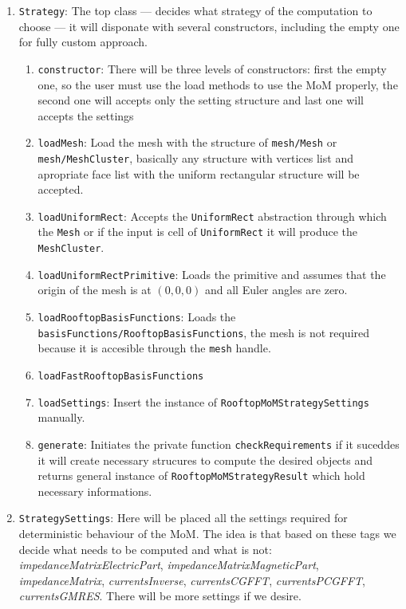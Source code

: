 \documentclass[9pt]{article}
\begin{document}
    \begin{enumerate}[label=\Roman*.]
        \item \texttt{Strategy}: The top class --- decides what strategy of the computation to choose --- it will disponate with several constructors, including the empty one for fully custom approach.
        \begin{enumerate}[label=\roman*.]
            \item \texttt{constructor}: There will be three levels of constructors: first the empty one, so the user must use the load methods to use the MoM properly, the second one will accepts only the setting structure and last one will accepts the settings 
            \item \texttt{loadMesh}: Load the mesh with the structure of \texttt{mesh/Mesh} or \texttt{mesh/MeshCluster}, basically any structure with vertices list and apropriate face list with the uniform rectangular structure will be accepted.
            \item \texttt{loadUniformRect}: Accepts the \texttt{UniformRect} abstraction through which the \texttt{Mesh} or if the input is cell of \texttt{UniformRect} it will produce the \texttt{MeshCluster}.
            \item \texttt{loadUniformRectPrimitive}: Loads the primitive and assumes that the origin of the mesh is at $(0, 0, 0)$ and all Euler angles are zero.
            \item \texttt{loadRooftopBasisFunctions}: Loads the \texttt{basisFunctions/RooftopBasisFunctions}, the mesh is not required because it is accesible through the \texttt{mesh} handle.
            \item \texttt{loadFastRooftopBasisFunctions}
            \item \texttt{loadSettings}: Insert the instance of \texttt{RooftopMoMStrategySettings} manually.
            \item \texttt{generate}: Initiates the private function \texttt{checkRequirements} if it suceddes it will create necessary strucures to compute the desired objects and returns general instance of \texttt{RooftopMoMStrategyResult} which hold necessary informations.
        \end{enumerate}
        \item \texttt{StrategySettings}: Here will be placed all the settings required for deterministic behaviour of the MoM. The idea is that based on these tags we decide what needs to be computed and what is not: \textit{impedanceMatrixElectricPart}, \textit{impedanceMatrixMagneticPart}, \textit{impedanceMatrix}, \textit{currentsInverse}, \textit{currentsCGFFT}, \textit{currentsPCGFFT}, \textit{currentsGMRES}. There will be more settings if we desire.

\end{enumerate}
\end{document}
